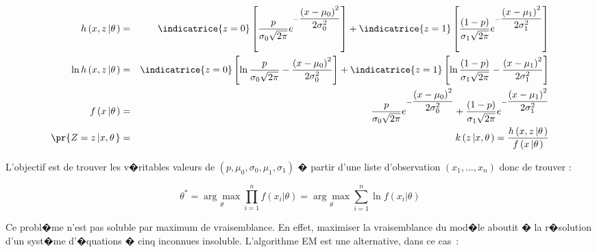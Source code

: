         \begin{eqnarray*}
        h\left(  x,z\left|  \theta\right.  \right)   &=& \indicatrice{z=0} \left[  \dfrac{p}{\sigma_0
                 \sqrt{2\pi}}e^{-\dfrac{\left( x-\mu
            _{0}\right)  ^{2}}{2\sigma_{0}^{2}}}\right]  + \indicatrice{z=1} \left[ 
                 \dfrac{\left(  1-p\right)  }{\sigma_1
             \sqrt{2\pi}}e^{-\dfrac
            {\left(  x-\mu_{1}\right)  ^{2}}{2\sigma_{1}^{2}}}\right] \\
        \ln h\left(  x,z\left|  \theta\right.  \right)   &=& \indicatrice{z=0}\left[ 
                 \ln\dfrac{p}{\sigma_0 \sqrt{2\pi}}-\dfrac{\left(
         x-\mu
            _{0}\right)  ^{2}}{2\sigma_{0}^{2}}\right]  +\indicatrice{z=1}\left[ 
                     \ln\dfrac{\left(  1-p\right)  }{\sigma_1
             \sqrt{2\pi}}-\dfrac{\left(
            x-\mu _{1}\right)  ^{2}}{2\sigma_{1}^{2}}\right] \\
        f\left(  x\left|  \theta\right.  \right)   &=& \dfrac{p}{\sigma_0 \sqrt{2\pi} }
                e^{-\dfrac{\left(  x-\mu_{0}\right)
            ^{2}}{2\sigma_{0}^{2}}}+\dfrac{\left(1-p\right)  }{\sigma_1 \sqrt{2\pi}}
                    e^{-\dfrac{\left(  x-\mu_{1}\right)  ^{2}}
             {2\sigma_{1}^{2}}}\\
        \pr{  Z=z\left|  x,\theta\right.  }   &=& k\left(  z\left| x,\theta\right. 
                 \right)  =\dfrac{h\left(  x,z\left| 
         \theta\right.  \right)
            }{f\left(  x\left|  \theta\right.  \right)  }
        \end{eqnarray*}

L'objectif est de trouver les v�ritables valeurs de $\left(  p,\mu _{0},\sigma_{0},\mu_{1},\sigma_{1}\right)  $ � partir d'une liste d'observation $\left(  x_{1},...,x_{n}\right)  $ donc de trouver :

        $$
        \theta^{\ast}=\underset{\theta}{\arg\max}\underset{i=1}{\overset{n}{\prod}
        }f\left(  x_{i}\left|  \theta\right.  \right)  =\underset{\theta}{\arg\max
                 }\underset{i=1}{\overset{n}{\sum}}\ln f\left( 
         x_{i}\left|
        \theta\right. \right)
        $$

Ce probl�me n'est pas soluble par maximum de vraisemblance. En effet, maximiser la vraisemblance du mod�le aboutit � la r�solution d'un syst�me d'�quations � cinq inconnues insoluble. L'algorithme EM est une alternative, dans ce cas~:


